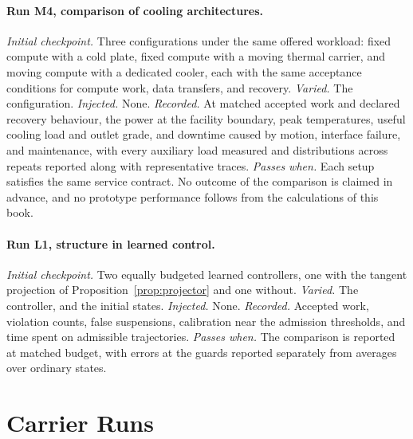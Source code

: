 \documentclass[11pt,openany]{book}
\theoremstyle{plain}
\theoremstyle{definition}
\theoremstyle{remark}
\begin{document}
\paragraph{Run M4, comparison of cooling architectures.} \emph{Initial checkpoint.} Three configurations under the same offered workload: fixed compute with a cold plate, fixed compute with a moving thermal carrier, and moving compute with a dedicated cooler, each with the same acceptance conditions for compute work, data transfers, and recovery. \emph{Varied.} The configuration. \emph{Injected.} None. \emph{Recorded.} At matched accepted work and declared recovery behaviour, the power at the facility boundary, peak temperatures, useful cooling load and outlet grade, and downtime caused by motion, interface failure, and maintenance, with every auxiliary load measured and distributions across repeats reported along with representative traces. \emph{Passes when.} Each setup satisfies the same service contract. No outcome of the comparison is claimed in advance, and no prototype performance follows from the calculations of this book.

\paragraph{Run L1, structure in learned control.} \emph{Initial checkpoint.} Two equally budgeted learned controllers, one with the tangent projection of Proposition~\ref{prop:projector} and one without. \emph{Varied.} The controller, and the initial states. \emph{Injected.} None. \emph{Recorded.} Accepted work, violation counts, false suspensions, calibration near the admission thresholds, and time spent on admissible trajectories. \emph{Passes when.} The comparison is reported at matched budget, with errors at the guards reported separately from averages over ordinary states.

\section{Carrier Runs}
\end{document}
